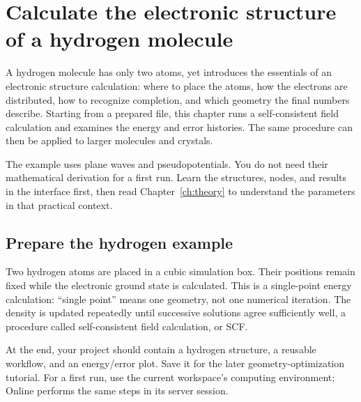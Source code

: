 \chapter{Calculate the electronic structure of a hydrogen molecule}\label{ch:first}

A hydrogen molecule has only two atoms, yet introduces the essentials of an electronic structure calculation: where to place the atoms, how the electrons are distributed, how to recognize completion, and which geometry the final numbers describe. Starting from a prepared file, this chapter runs a self-consistent field calculation and examines the energy and error histories. The same procedure can then be applied to larger molecules and crystals.

The example uses plane waves and pseudopotentials. You do not need their mathematical derivation for a first run. Learn the structures, nodes, and results in the interface first, then read Chapter~\ref{ch:theory} to understand the parameters in that practical context.

\section{Prepare the hydrogen example}

Two hydrogen atoms are placed in a cubic simulation box. Their positions remain fixed while the electronic ground state is calculated. This is a single-point energy calculation: ``single point'' means one geometry, not one numerical iteration. The density is updated repeatedly until successive solutions agree sufficiently well, a procedure called self-consistent field calculation, or SCF.

At the end, your project should contain a hydrogen structure, a reusable workflow, and an energy/error plot. Save it for the later geometry-optimization tutorial. For a first run, use the current workspace's computing environment; Online performs the same steps in its server session.

